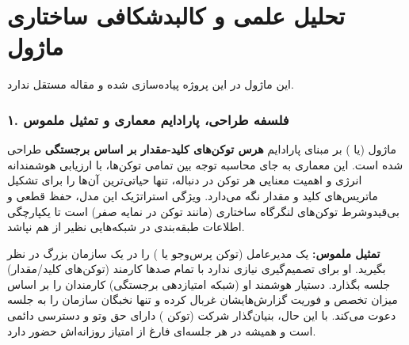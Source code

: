 \section{تحلیل علمی و کالبدشکافی ساختاری ماژول }

این ماژول در این پروژه پیاده‌سازی شده و مقاله مستقل ندارد.
\label{sec:tt}

\subsubsection*{۱. فلسفه طراحی، پارادایم معماری و تمثیل ملموس}
ماژول  (یا ) بر مبنای پارادایم \textbf{هرس توکن‌های کلید-مقدار بر اساس برجستگی } طراحی شده است. این معماری به جای محاسبه توجه بین تمامی توکن‌ها، با ارزیابی هوشمندانه انرژی و اهمیت معنایی هر توکن در دنباله، تنها حیاتی‌ترین آن‌ها را برای تشکیل ماتریس‌های کلید و مقدار نگه می‌دارد. ویژگی استراتژیک این مدل، حفظ قطعی و بی‌قیدوشرط توکن‌های لنگرگاه ساختاری (مانند توکن \lr{[CLS]} در نمایه صفر) است تا یکپارچگی اطلاعات طبقه‌بندی در شبکه‌هایی نظیر  از هم نپاشد.

\textbf{تمثیل ملموس:}
یک مدیرعامل (توکن پرس‌وجو یا ) را در یک سازمان بزرگ در نظر بگیرید. او برای تصمیم‌گیری نیازی ندارد با تمام صدها کارمند (توکن‌های کلید/مقدار) جلسه بگذارد. دستیار هوشمند او (شبکه امتیازدهی برجستگی) کارمندان را بر اساس میزان تخصص و فوریت گزارش‌هایشان غربال کرده و تنها نخبگان سازمان را به جلسه دعوت می‌کند. با این حال، بنیان‌گذار شرکت (توکن \lr{[CLS]}) دارای حق وتو و دسترسی دائمی است و همیشه در هر جلسه‌ای فارغ از امتیاز روزانه‌اش حضور دارد.

